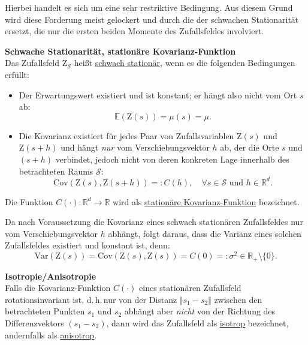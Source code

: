 Hierbei handelt es sich um eine sehr restriktive Bedingung.
Aus diesem Grund wird diese Forderung meist gelockert 
und durch die der schwachen Stationarität ersetzt, die nur die 
ersten beiden Momente des Zufallsfeldes involviert.

\begin{definition} \textbf{Schwache Stationarität,
stationäre Kovarianz-Funktion} \\
Das Zufallsfeld $\mathrm{Z}_\mathcal{S}$ heißt
\underline{schwach stationär}, wenn es die folgenden 
Bedingungen erfüllt:

\begin{itemize}[topsep=2pt,parsep=1pt,itemsep=0.5pt]
\item[$\circ$] Der Erwartungswert existiert und ist konstant; 
er hängt also nicht vom Ort $s$ ab:
\begin{equation}
\label{Gl_Def_schwach_stationär_Erwartungswert}
\mathbb{E}\left( \mathrm{Z}(s) \right) = \mu(s) = \mu.
\end{equation}
\item[$\circ$] Die Kovarianz existiert für jedes Paar von
Zufallsvariablen $\mathrm{Z}(s)$ und $\mathrm{Z}(s+h)$ und 
hängt \textit{nur} vom Verschiebungsvektor $h$ ab, der die 
Orte $s$ und $(s+h)$ verbindet, jedoch nicht von deren 
konkreten Lage innerhalb des betrachteten Raums $\mathcal{S}$:
\begin{equation}
\label{Gl_Def_schwach_stationär_Kovarianz}
\mathrm{Cov} \left( \mathrm{Z}(s), \mathrm{Z}(s+h) \right) =:
C(h),\quad \forall s \in \mathcal{S} \textrm{ und } h \in \mathbb{R}^d.
\end{equation}
\end{itemize}
Die Funktion $C(\cdot): \mathbb{R}^d \rightarrow \mathbb{R}$ 
wird als \underline{stationäre Kovarianz-Funktion} bezeichnet.
\end{definition}

Da nach Voraussetzung die Kovarianz eines schwach stationären 
Zufallsfeldes nur vom Verschiebungsvektor $h$ abhängt, folgt daraus, 
dass die Varianz eines solchen Zufallsfeldes existiert und konstant 
ist, denn:
\begin{equation}
\label{Gl_VarianzZF_schwach_stationär}
\mathrm{Var} \left( \mathrm{Z}(s) \right) = 
\mathrm{Cov} \left( \mathrm{Z}(s), \mathrm{Z}(s) \right) = C(0) =: 
\sigma^2 \in \mathbb{R}_+\setminus \lbrace 0 \rbrace.
\end{equation}

\begin{definition} \textbf{Isotropie/Anisotropie} \\
Falls die Kovarianz-Funktion $C(\cdot)$ eines stationären Zufallsfeld 
rotationsinvariant ist, d.\,h.\,nur von der Distanz 
$\Vert s_1 - s_2\Vert$ zwischen den betrachteten 
Punkten $s_1$ und $s_2$ abhängt aber \textit{nicht} von der Richtung 
des Differenzvektors $(s_1 - s_2)$, dann wird das
Zufallsfeld als \underline{isotrop} bezeichnet, andernfalls 
als \underline{anisotrop}.
\end{definition}


